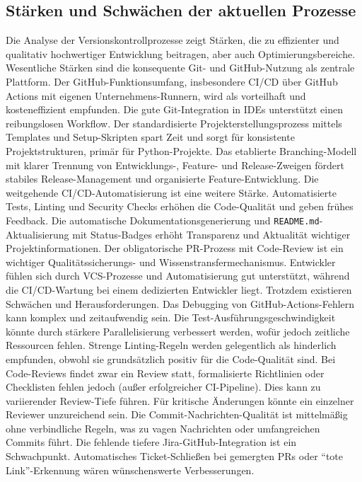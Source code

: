 \documentclass[12pt,oneside]{article}
\begin{document}
    \subsection{Stärken und Schwächen der aktuellen Prozesse}
    \label{subsec:ss_vk}
    Die Analyse der Versionskontrollprozesse zeigt Stärken, die zu effizienter und qualitativ hochwertiger Entwicklung beitragen, aber auch Optimierungsbereiche.
    \newline
    Wesentliche Stärken sind die konsequente Git- und GitHub-Nutzung als zentrale Plattform. Der GitHub-Funktionsumfang, insbesondere CI/CD über GitHub Actions mit eigenen Unternehmens-Runnern, wird als vorteilhaft und kosteneffizient empfunden. Die gute Git-Integration in IDEs unterstützt einen reibungslosen Workflow. Der standardisierte Projekterstellungsprozess mittels Templates und Setup-Skripten spart Zeit und sorgt für konsistente Projektstrukturen, primär für Python-Projekte. Das etablierte Branching-Modell mit klarer Trennung von Entwicklungs-, Feature- und Release-Zweigen fördert stabiles Release-Management und organisierte Feature-Entwicklung.
    \newline
    Die weitgehende CI/CD-Automatisierung ist eine weitere Stärke. Automatisierte Tests, Linting und Security Checks erhöhen die Code-Qualität und geben frühes Feedback. Die automatische Dokumentationsgenerierung und \texttt{README.md}-Aktualisierung mit Status-Badges erhöht Transparenz und Aktualität wichtiger Projektinformationen. Der obligatorische PR-Prozess mit Code-Review ist ein wichtiger Qualitätssicherungs- und Wissenstransfermechanismus. Entwickler fühlen sich durch VCS-Prozesse und Automatisierung gut unterstützt, während die CI/CD-Wartung bei einem dedizierten Entwickler liegt.
    \newline
    Trotzdem existieren Schwächen und Herausforderungen. Das Debugging von GitHub-Actions-Fehlern kann komplex und zeitaufwendig sein. Die Test-Ausführungsgeschwindigkeit könnte durch stärkere Parallelisierung verbessert werden, wofür jedoch zeitliche Ressourcen fehlen. Strenge Linting-Regeln werden gelegentlich als hinderlich empfunden, obwohl sie grundsätzlich positiv für die Code-Qualität sind.
    \newline
    Bei Code-Reviews findet zwar ein Review statt, formalisierte Richtlinien oder Checklisten fehlen jedoch (außer erfolgreicher CI-Pipeline). Dies kann zu variierender Review-Tiefe führen. Für kritische Änderungen könnte ein einzelner Reviewer unzureichend sein. Die Commit-Nachrichten-Qualität ist mittelmäßig ohne verbindliche Regeln, was zu vagen Nachrichten oder umfangreichen Commits führt.
    \newline
    Die fehlende tiefere Jira-GitHub-Integration ist ein Schwachpunkt. Automatisches Ticket-Schließen bei gemergten PRs oder ``tote Link''-Erkennung wären wünschenswerte Verbesserungen.
\end{document}
